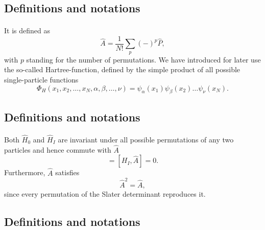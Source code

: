 \documentclass[%
twoside,                 %
final,                   %
10pt]{article}
\begin{document}
\subsection{Definitions and notations}

\paragraph{}
It is defined as
\begin{equation}
  \hat{A} = \frac{1}{N!}\sum_{p} (-)^p\hat{P},
\label{antiSymmetryOperator}
\end{equation}
with $p$ standing for the number of permutations. We have introduced for later use the so-called
Hartree-function, defined by the simple product of all possible single-particle functions
\[
  \Phi_H(x_1,x_2,\dots,x_N,\alpha,\beta,\dots,\nu) =
  \psi_{\alpha}(x_1)
    \psi_{\beta}(x_2)\dots\psi_{\nu}(x_N).
\]



\subsection{Definitions and notations}

\paragraph{}
Both $\hat{H}_0$ and $\hat{H}_I$ are invariant under all possible permutations of any two particles
and hence commute with $\hat{A}$
\begin{equation}
  [H_0,\hat{A}] = [H_I,\hat{A}] = 0. \label{commutionAntiSym}
\end{equation}
Furthermore, $\hat{A}$ satisfies
\begin{equation}
  \hat{A}^2 = \hat{A},  \label{AntiSymSquared}
\end{equation}
since every permutation of the Slater
determinant reproduces it.



\subsection{Definitions and notations}

\end{document}
